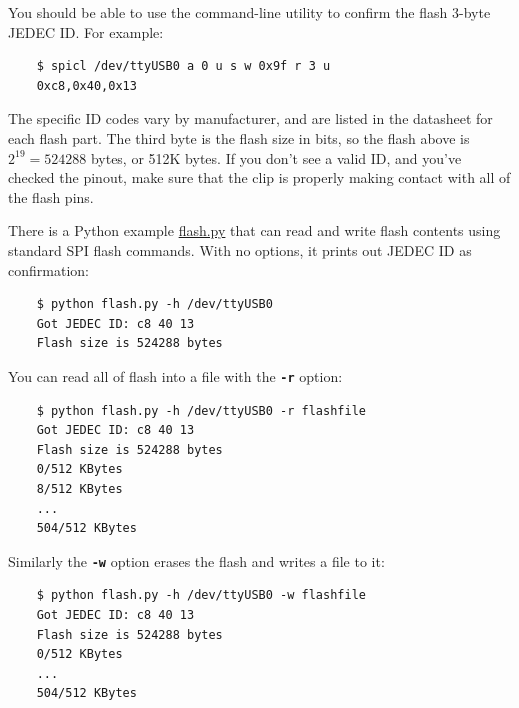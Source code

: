 \documentclass{article}
\newcommand{\mach}[1]{\texttt{\textbf{#1}}}
\begin{document}
You should be able to use the command-line utility to confirm the flash 3-byte JEDEC ID.
For example:

\begin{lstlisting}
    $ spicl /dev/ttyUSB0 a 0 u s w 0x9f r 3 u
    0xc8,0x40,0x13
\end{lstlisting}

The specific ID codes vary by manufacturer, and are listed in the datasheet for each flash part.
The third byte is the flash size in bits, so the flash above is
$2^{19} = 524288$ bytes, or 512K bytes.
If you don't see a valid ID, and you've checked the pinout,
make sure that the clip is properly making contact with all of the flash pins.

There is a Python example
\href{https://github.com/jamesbowman/spidriver/blob/master/python/samples/flash.py>}{flash.py}
that can read and write flash contents using standard
SPI flash commands.
With no options, it prints out JEDEC ID as confirmation:

\begin{lstlisting}
    $ python flash.py -h /dev/ttyUSB0
    Got JEDEC ID: c8 40 13
    Flash size is 524288 bytes
\end{lstlisting}

You can read all of flash into a file with the \mach{-r} option:

\begin{lstlisting}
    $ python flash.py -h /dev/ttyUSB0 -r flashfile
    Got JEDEC ID: c8 40 13
    Flash size is 524288 bytes
    0/512 KBytes
    8/512 KBytes
    ...
    504/512 KBytes
\end{lstlisting}

Similarly the \mach{-w} option erases the flash and writes a file to it:

\begin{lstlisting}
    $ python flash.py -h /dev/ttyUSB0 -w flashfile
    Got JEDEC ID: c8 40 13
    Flash size is 524288 bytes
    0/512 KBytes
    ...
    504/512 KBytes
\end{lstlisting}

% 
% 
\end{document}
